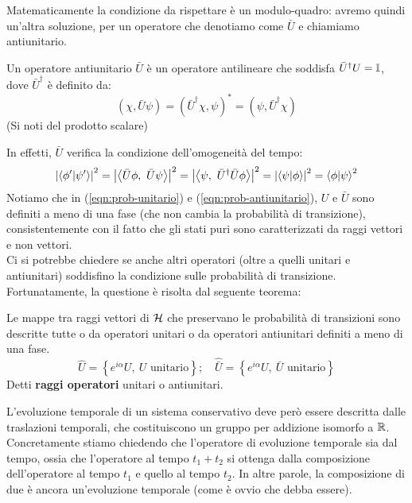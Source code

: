 \documentclass[../../FisicaTeorica.tex]{subfiles}
\begin{document}
Matematicamente la condizione da rispettare è un modulo-quadro: avremo quindi un'altra soluzione, per un operatore  che denotiamo come $\bar{U}$ e chiamiamo antiunitario.
\begin{dfn}
Un operatore antiunitario $\bar{U}$ è un operatore antilineare che soddisfa ${\bar{U}}^\dag U=\mathbb{I}$, dove ${\bar{U}}^\dag$ è definito da:
\[
\left(\chi,\bar{U}\psi\right)=\left({\bar{U}}^\dag\chi,\psi\right)^\ast=\left(\psi,{\bar{U}}^\dag\chi\right)
\]
(Si noti  del prodotto scalare)
\end{dfn}
In effetti, $\bar{U}$ verifica la condizione dell'omogeneità del tempo:
\begin{equation}
\left|\left\langle\phi^\prime\middle|\psi^\prime\right\rangle\right|^2=\left|\left\langle\bar{U}\phi,\ \bar{U}\psi\right\rangle\right|^2=\left|\left\langle\psi,\ {\bar{U}}^\dag\bar{U}\phi\right\rangle\right|^2=\left|\left\langle\psi\middle|\phi\right\rangle\right|^2=\braket{\phi|\psi}^2
\label{eqn:prob-antiunitario}
\end{equation}
Notiamo che in (\ref{eqn:prob-unitario}) e (\ref{eqn:prob-antiunitario}), $U$ e $\bar{U}$  sono definiti a meno di una fase (che non cambia la probabilità di transizione), consistentemente con il fatto che gli stati puri sono caratterizzati da raggi vettori e non vettori.\\
Ci si potrebbe chiedere se anche altri operatori (oltre a quelli unitari e antiunitari) soddisfino la condizione sulle probabilità di transizione.\\
Fortunatamente, la questione è risolta dal seguente teorema:
\begin{thm}
Le mappe tra raggi vettori di $\mathcal{H}$ che preservano le probabilità di transizioni sono descritte tutte o da operatori unitari o da operatori antiunitari definiti a meno di una fase.
\[
\hat{U}=\left\{e^{i\alpha}U,\ U\text{ unitario}\right\}; \quad 
\widehat{\bar{U}}=\left\{e^{i\alpha}U,\ \bar{U}\text{ unitario}\right\}
\]
Detti \textbf{raggi operatori} unitari o antiunitari.
\end{thm}
L'evoluzione temporale di un sistema conservativo deve però essere descritta dalle traslazioni temporali, che costituiscono un gruppo per addizione isomorfo a $\mathbb{R}$.\\
Concretamente stiamo chiedendo che l'operatore di evoluzione temporale sia  dal tempo, ossia che l'operatore al tempo $t_1+t_2$ si ottenga dalla composizione dell'operatore al tempo $t_1$ e quello al tempo $t_2$. In altre parole, la composizione di due  è ancora un'evoluzione temporale (come è ovvio che debba essere).\\
\end{document}
